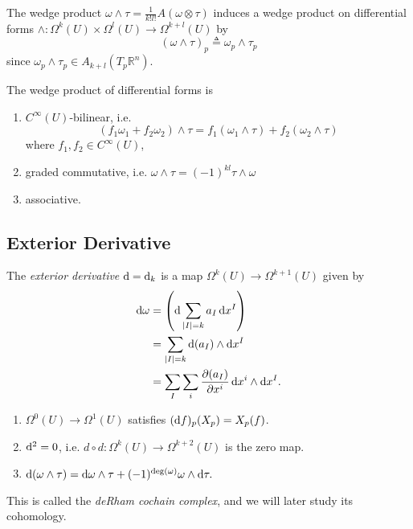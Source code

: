 The wedge product
$\omega \wedge \tau = \frac{1}{k! l!}A(\omega \otimes \tau)$
induces a wedge product on differential forms
$\wedge : \Omega^k(U) \times \Omega^l(U) \to \Omega^{k+l}(U)$
by
$$
(\omega \wedge \tau)_p \triangleq \omega_p \wedge \tau_p
$$
since $\omega_p \wedge \tau_p \in A_{k+l}(T_p \mathbb{R}^n)$.

The wedge product of differential forms is
\begin{enumerate}
  \item{
    $C^\infty(U)$-bilinear, i.e.
    $$
      (f_1 \omega_1 + f_2 \omega_2) \wedge \tau
    = f_1(\omega_1 \wedge \tau) + f_2(\omega_2 \wedge \tau)
    $$
    where $f_1, f_2 \in C^\infty(U)$,
  }
  \item{
    graded commutative, i.e.
    $\omega \wedge \tau = (-1)^{kl} \tau \wedge \omega$
  }
  \item{
    associative.
  }
\end{enumerate}

\subsection{Exterior Derivative}
\begin{defn}
The \emph{exterior derivative} $\mathop{}\!\mathrm{d} = \mathop{}\!\mathrm{d}_k$ is a map
$\Omega^k(U) \to \Omega^{k+1}(U)$ given by
\begin{align*}
   \mathop{}\!\mathrm{d} \omega
&= \left(
     \mathop{}\!\mathrm{d} \sum_{|I| = k} a_I \mathop{}\!\mathrm{d} x^I
   \right) \\
&= \sum_{|I| = k} \mathop{}\!\mathrm{d} (a_I) \wedge \mathop{}\!\mathrm{d} x^I \\
&= \sum_I \sum_i
     \frac{\partial (a_I)}
          {\partial x^i}
     \mathop{}\!\mathrm{d} x^i \wedge \mathop{}\!\mathrm{d} x^I.
\end{align*}
\end{defn}

\begin{remark}[Properties]
  \begin{enumerate}
    \item{
      $\Omega^0(U) \to \Omega^1(U)$ satisfies
      $(\mathop{}\!\mathrm{d} f)_p(X_p) = X_p(f)$.
    }
    \item{
      $\mathop{}\!\mathrm{d}^2 = 0$, i.e.
      $d \circ d : \Omega^k(U) \to \Omega^{k+2}(U)$ is the zero map.
    }
    \item{
      $
        \mathop{}\!\mathrm{d} (\omega \wedge \tau)
      = \mathop{}\!\mathrm{d} \omega \wedge \tau
      + (-1)^{\deg(\omega)} \omega \wedge \mathop{}\!\mathrm{d} \tau.
      $
    }
  \end{enumerate}
  This is called the \emph{deRham cochain complex}, and we will later
  study its cohomology.
\end{remark}


